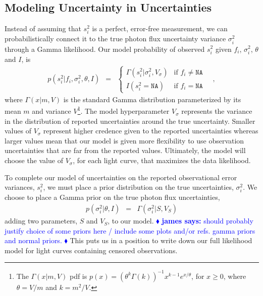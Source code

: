 \documentclass[12pt,preprint]{aastex}
\newcommand{\fobs}{f_i}
\newcommand{\sobs}{s^2_i}
\newcommand{\james}[1] { \textcolor{blue} {
\ensuremath{\blacklozenge} {\bf james says:}  {#1}
\ensuremath{\blacklozenge} } }
\begin{document}
\subsection{Modeling Uncertainty in Uncertainties}
\label{sec:uncertainty}
Instead of assuming that $\sobs$ is a perfect, error-free measurement, we can probabilistically connect it to the true photon flux uncertainty variance $\sigma^2_i$ through a Gamma likelihood.  Our model probability of observed $\sobs$ given $\fobs$, $\sigma^2_i$, $\theta$ and $I$, is
\begin{eqnarray}\displaystyle
p(\sobs | \fobs, \sigma^2_i, \theta,I) &=& \left\{\begin{array}{ll}
  \Gamma (\sobs | \sigma^2_i, V_{\sigma} ) & \mbox{if $\fobs \ne \texttt{NA}$} \\
 I(\sobs = \texttt{NA})& \mbox{if $\fobs = \texttt{NA}$}
\end{array}\right.\label{eq:slik}
\quad ,
\end{eqnarray}
where $\Gamma(x | m, V)$ is the standard Gamma distribution parameterized by its mean $m$ and variance $V$\footnote{The $\Gamma(x | m, V)$ pdf is $ p(x ) = (\theta^k \Gamma(k))^{-1}  x^{k-1} e^{x/ \theta}$, for $x \ge 0$, where $\theta = V / m$ and $k  = m^2 / V$.}.
The  model hyperparameter $V_\sigma$ represents the
variance in the distribution of reported uncertainties around the true
uncertainty.  Smaller values of $V_\sigma$ represent higher credence given to the reported uncertainties whereas larger values mean that our model is given more flexibility to use observation uncertainties that are far from the reported values.  Ultimately, the model will choose the value of $V_\sigma$, for each light curve, that maximizes the data likelihood.

To complete our model of uncertainties on the reported observational error variances, $s_i^2$, we must place a prior distribution on the true uncertainties, $\sigma_i^2$.  We choose to place a Gamma prior on the true photon flux uncertainties, 
\begin{eqnarray}\displaystyle
p(\sigma^2_i|\theta, I) &=& \Gamma(\sigma^2_i | S, V_S)
\label{eq:sigma_prior}
\end{eqnarray}
adding two parameters, $S$ and $V_S$, to our model.
\james{should probably justify choice of some priors here / include some plots and/or refs. gamma priors and normal priors.}  This puts us in a position to write down our full likelihood model for light curves containing censored observations.
\end{document}
